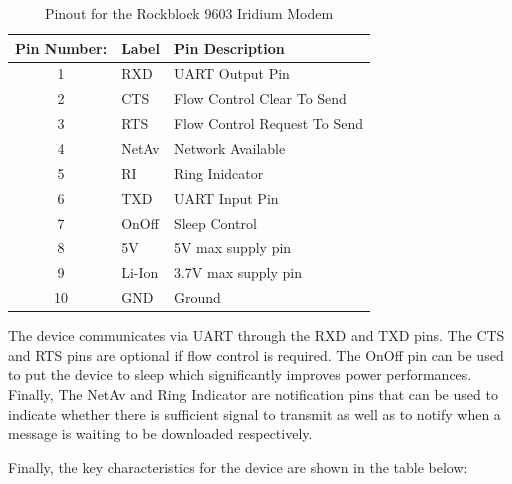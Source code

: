 \begin{table}[H]
    \centering
    \caption{Pinout for the Rockblock 9603 Iridium Modem}
    \begin{tabular}{c l l}
        \hline
         Pin Number: & Label & Pin Description\\
          \hline
          \hline
         1 & RXD & UART Output Pin \\
        
         2 & CTS & Flow Control Clear To Send\\
         3 & RTS & Flow Control Request To Send\\
         4 & NetAv & Network Available \\
         5 & RI & Ring Inidcator \\
         6 & TXD & UART Input Pin \\
         7 & OnOff & Sleep Control\\
         8 & 5V & 5V max supply pin \\
         9 & Li-Ion & 3.7V max supply pin \\
         10 & GND & Ground \\
         \hline
         \hline
    \end{tabular}

    \label{tab:ir_pinout}
\end{table}

The device communicates via UART through the RXD and TXD pins. The CTS and RTS pins are optional if flow control is required. The OnOff pin can be used to put the device to sleep which significantly improves power performances. Finally, The NetAv and Ring Indicator are notification pins that can be used to indicate whether there is sufficient signal to transmit as well as to notify when a message is waiting to be downloaded respectively. 

Finally, the key characteristics for the device are shown in the table below:

